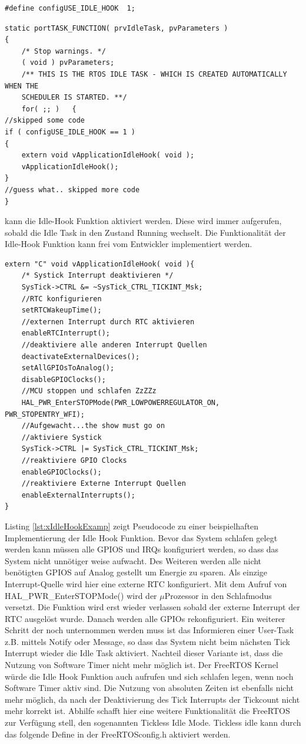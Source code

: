 \begin{lstlisting}[label=lst:defineIdleHook, numbers = none]
#define configUSE_IDLE_HOOK  1; 
\end{lstlisting}
\begin{lstlisting}[caption={Aufruf der IdleTask Hook Funktion durch die FreeRTOS Idle Task. Aus Task.c},captionpos=b, label=lst:xIdleTaskHook, float=htb!]
static portTASK_FUNCTION( prvIdleTask, pvParameters )
{
	/* Stop warnings. */
	( void ) pvParameters;
	/** THIS IS THE RTOS IDLE TASK - WHICH IS CREATED AUTOMATICALLY WHEN THE
	SCHEDULER IS STARTED. **/
	for( ;; )	{
//skipped some code
if ( configUSE_IDLE_HOOK == 1 )
{
	extern void vApplicationIdleHook( void );
	vApplicationIdleHook();
}
//guess what.. skipped more code
}     
\end{lstlisting}
kann die Idle-Hook Funktion aktiviert werden. Diese wird immer aufgerufen, sobald die Idle Task in den Zustand Running wechselt. Die Funktionalität der Idle-Hook Funktion kann frei vom Entwickler implementiert werden. 
\begin{lstlisting}[caption={Pseudocode für eine Idle Hook Funktion},captionpos=b, label=lst:xIdleHookExamp, float=hbt!]
extern "C" void vApplicationIdleHook( void ){
	/* Systick Interrupt deaktivieren */
	SysTick->CTRL &= ~SysTick_CTRL_TICKINT_Msk;
	//RTC konfigurieren
	setRTCWakeupTime();
	//externen Interrupt durch RTC aktivieren
	enableRTCInterrupt();
	//deaktiviere alle anderen Interrupt Quellen
	deactivateExternalDevices();
	setAllGPIOsToAnalog(); 
	disableGPIOClocks();
	//MCU stoppen und schlafen ZzZZz
	HAL_PWR_EnterSTOPMode(PWR_LOWPOWERREGULATOR_ON, PWR_STOPENTRY_WFI); 
	//Aufgewacht...the show must go on
	//aktiviere Systick
	SysTick->CTRL |= SysTick_CTRL_TICKINT_Msk;
	//reaktiviere GPIO Clocks
	enableGPIOClocks();
	//reaktiviere Externe Interrupt Quellen
	enableExternalInterrupts();	
}
\end{lstlisting}
Listing \ref{lst:xIdleHookExamp} zeigt Pseudocode zu einer beispielhaften Implementierung der Idle Hook Funktion. Bevor das System schlafen gelegt werden kann müssen alle GPIOS und IRQs konfiguriert werden, so dass das System nicht unnötiger weise aufwacht. Des Weiteren werden alle nicht benötigten GPIOS auf Analog gestellt um Energie zu sparen. Als einzige Interrupt-Quelle wird hier eine externe RTC konfiguriert. Mit dem Aufruf von HAL\_PWR\_EnterSTOPMode() wird der $\mu$\-Pro\-zesso\-r in den Schlafmodus versetzt. Die Funktion wird erst wieder verlassen sobald der externe Interrupt der RTC ausgelöst wurde. Danach werden alle GPIOs rekonfiguriert. Ein weiterer Schritt der noch unternommen werden muss ist das Informieren einer User-Task z.B. mittels Notify oder Message, so dass das System nicht beim nächsten Tick Interrupt wieder die Idle Task aktiviert. Nachteil dieser Variante ist, dass die Nutzung von Software Timer nicht mehr möglich ist. Der FreeRTOS Kernel würde die Idle Hook Funktion auch aufrufen und sich schlafen legen, wenn noch Software Timer aktiv sind. Die Nutzung von absoluten Zeiten ist ebenfalls nicht mehr möglich, da nach der Deaktivierung des Tick Interrupts der Tickcount nicht mehr korrekt ist. Abhilfe schafft hier eine weitere Funktionalität die FreeRTOS zur Verfügung stell, den sogenannten Tickless Idle Mode. Tickless idle kann durch das folgende Define in der FreeRTOSconfig.h aktiviert werden.  

